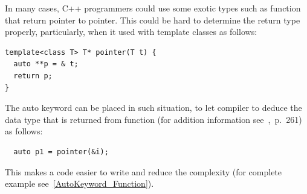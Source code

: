 \documentclass[11pt]{report}
\begin{document}
In many cases, C++ programmers could use some exotic types such as function that return pointer to pointer. This could be hard to determine the return type properly, particularly, when it used with template classes as follows:
\begin{lstlisting}
template<class T> T* pointer(T t) {
  auto **p = & t;
  return p;
}
\end{lstlisting}
The auto keyword can be placed in such situation, to let compiler to deduce the data type that is returned from function (for addition information see~\cite{Overland:2011:CWF},~p.~261) as follows:
\begin{lstlisting}
  auto p1 = pointer(&i);
\end{lstlisting}
This makes a code easier to write and reduce the complexity (for complete example see~\ref{AutoKeyword_Function}).
\end{document}
